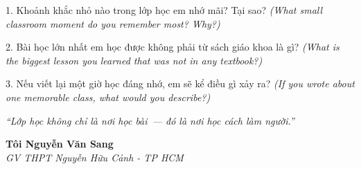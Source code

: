 \begin{tuhocnhanh}
1. Khoảnh khắc nhỏ nào trong lớp học em nhớ mãi? Tại sao? \textit{(What small classroom moment do you remember most? Why?)}

2. Bài học lớn nhất em học được không phải từ sách giáo khoa là gì? \textit{(What is the biggest lesson you learned that was not in any textbook?)}

3. Nếu viết lại một giờ học đáng nhớ, em sẽ kể điều gì xảy ra? \textit{(If you wrote about one memorable class, what would you describe?)}
\end{tuhocnhanh}

\begin{center}
\textit{\color{dustgold}``Lớp học không chỉ là nơi học bài~--- đó là nơi học cách làm người.''}
\end{center}

\begin{flushright}
\textbf{Tôi Nguyễn Văn Sang}\\
\textit{GV THPT Nguyễn Hữu Cảnh - TP HCM}
\end{flushright}

\ngancach
